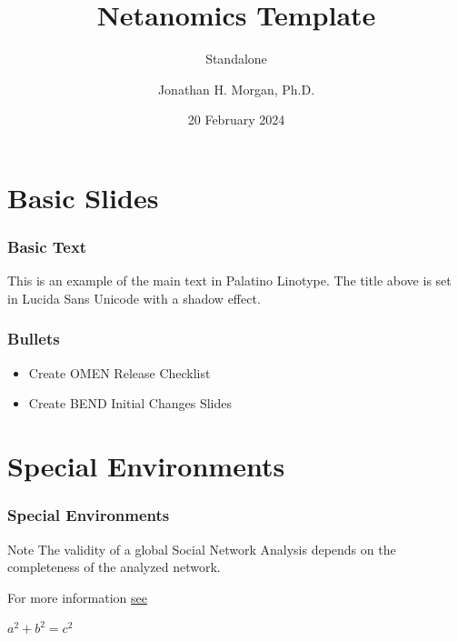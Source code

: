 \documentclass[t, aspectratio=169]{beamer}
\title{Netanomics Template}
\subtitle{Standalone}
\author{Jonathan H. Morgan, Ph.D.}
\date{20 February 2024}
\begin{document}
\setTitlePageBackground
\begin{frame}[plain]
  \titlepage
\end{frame}

\setMainSlideBackground
\begin{frame}
    \frametitle{}
    \tableofcontents
\end{frame}

\section{Basic Slides}

\begin{frame}
    \frametitle{Basic Text}
    {\selectfont This is an example of the main text in Palatino Linotype.} The title above is set in Lucida Sans Unicode with a shadow effect.
\end{frame}

\begin{frame}
    \frametitle{Bullets}
    \begin{itemize}
        \item Create OMEN Release Checklist
        \item Create BEND Initial Changes Slides
    \end{itemize}
\end{frame}

\section{Special Environments}

\begin{frame}
    \frametitle{Special Environments}
    \begin{block}{Note}
        The validity of a global Social Network Analysis depends on the completeness of the analyzed network.
    \end{block}

    \begin{example}
        For more information \href{https://www.youtube.com/watch?v=rx7wwtmFlD8&list=PLHXZ9OQGMqxcWWkx2DMnQmj5os2X5ZR73&index=9}{see}
    \end{example}

    \begin{theorem}[Pythagoras]
        $a^2 + b^2 = c^2$
    \end{theorem}
\end{frame}
\end{document}
